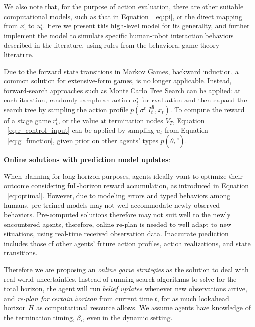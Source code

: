 \documentclass[letterpaper, 10 pt, conference]{ieeeconf}  %
\begin{document}
We also note that, for the purpose of action evaluation, there are other 
suitable computational models, such as that in Equation ~\ref{eq:pi}, 
or the direct mapping from $x^i_t$ to $u^i_t$. Here we 
present this high-level model for its generality, and further implement the 
model to simulate specific human-robot interaction behaviors described in the 
literature, using rules from the behavioral game theory literature.  

Due to the forward state transitions in Markov Games, backward induction, a 
common solution for extensive-form games, is no longer applicable. Instead, 
forward-search approaches such as Monte Carlo Tree Search can be applied: at 
each iteration, randomly sample an action $a^i_t$ for evaluation and then expand the search 
tree by sampling the action profile $p(\sigma^t|I^R_t,x_t)$. To compute the 
reward of a stage game $r^i_t$, or the value at termination nodes $V_T$, 
Equation ~\ref{eq:r_control_input} can be applied by sampling $u_t$ from 
Equation ~\ref{eq:g_function}, given prior on other agents' types 
$p(\theta^{-i}_t)$. 

\textbf{Online solutions with prediction model updates}:

When planning for long-horizon purposes, agents ideally want to optimize their 
outcome considering full-horizon reward accumulation, as introduced in Equation 
~\ref{eq:optimal}. However, due to modeling errors and typed behaviors among 
humans, pre-trained models may not well accommodate newly observed behaviors. 
Pre-computed solutions therefore may not suit well to the newly 
encountered agents, therefore, online re-plan is needed to well adapt to new 
situations, using real-time received observation data. 
Inaccurate prediction includes those of other agents' future action profiles, action realizations, and state transitions. 

Therefore we are proposing an \textit{online game 
strategies} as the solution to deal with real-world uncertainties. Instead of running search algorithms to solve for the total 
horizon, the agent will run \textit{belief updates} whenever new 
observations arrive, and \textit{re-plan for certain horizon} from 
current time $t$, for as much lookahead horizon $H$ as computational resource 
allows. We assume agents have knowledge of the termination timing, $\beta_t$, 
even in the dynamic setting.
\end{document}
